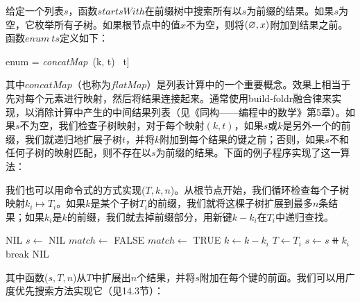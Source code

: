 \documentclass[b5paper]{ctexart}
\begin{document}
给定一个列表$s$，函数$startsWith$在前缀树中搜索所有以$s$为前缀的结果。如果$s$为空，它枚举所有子树。如果根节点中的值$x$不为空，则将$(\varnothing, x)$附加到结果之前。函数$enum\ ts$定义如下：

\be
enum = \textit{concatMap}\ (k, t) \mapsto [(k \doubleplus a, b) | (a, b) \in startsWith\ [\ ]\ t]
\ee

其中$\textit{concatMap}$（也称为$flatMap$）是列表计算中的一个重要概念。效果上相当于先对每个元素进行映射，然后将结果连接起来。通常使用build-foldr融合律来实现，以消除计算中产生的中间结果列表（见《同构——编程中的数学》第5章）。如果$s$不为空，我们检查子树映射，对于每个映射$(k, t)$，如果$s$或$k$是另外一个的前缀，我们就递归地扩展子树$t$，并将$k$附加到每个结果的键之前；否则，如果$s$不和任何子树的映射匹配，则不存在以$s$为前缀的结果。下面的例子程序实现了这一算法：


我们也可以用命令式的方式实现($T, k, n$)。从根节点开始，我们循环检查每个子树映射$k_i \mapsto T_i$。如果$k$是某个子树$T_i$的前缀，我们就将这棵子树扩展到最多$n$条结果；如果$k_i$是$k$的前缀，我们就去掉前缀部分，用新键$k - k_i$在$T_i$中递归查找。

\begin{algorithmic}[1]
     \State \Return NIL
  \EndIf
  \State $s \gets$ NIL
  \Repeat
    \State $match \gets$ FALSE
        \State \Return {}
      \EndIf
        \State $match \gets$ TRUE
        \State $k \gets k - k_i$  
        \State $T \gets T_i$
        \State $s \gets s \doubleplus k_i$
        \State break
      \EndIf
    \EndFor
  \State \Return NIL
\EndFunction
\end{algorithmic}

其中函数($s, T, n$)从$T$中扩展出$n$个结果，并将$s$附加在每个键的前面。我们可以用广度优先搜索方法实现它（见14.3节）：
\end{document}
